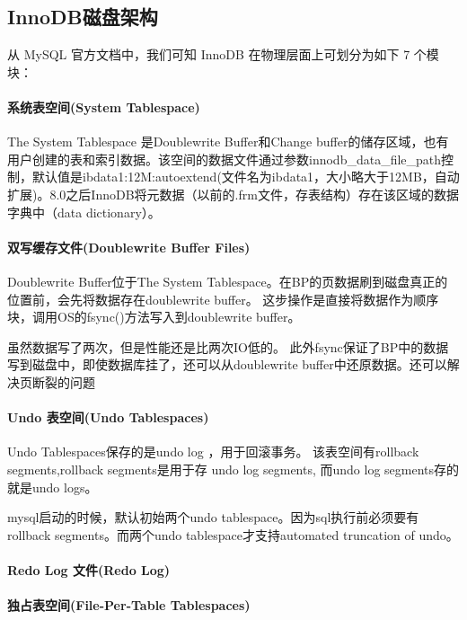 \documentclass[../../../interview-questions.tex]{subfiles}
\begin{document}
\subsection{InnoDB磁盘架构}

从 MySQL 官方文档中，我们可知 InnoDB 在物理层面上可划分为如下 7 个模块：

\paragraph{系统表空间(System Tablespace)}

The System Tablespace 是Doublewrite Buffer和Change buffer的储存区域，也有用户创建的表和索引数据。该空间的数据文件通过参数innodb\_data\_file\_path控制，默认值是ibdata1:12M:autoextend(文件名为ibdata1，大小略大于12MB，自动扩展)。8.0之后InnoDB将元数据（以前的.frm文件，存表结构）存在该区域的数据字典中（data dictionary）。

\paragraph{双写缓存文件(Doublewrite Buffer Files)}

Doublewrite Buffer位于The System Tablespace。在BP的页数据刷到磁盘真正的位置前，会先将数据存在doublewrite buffer。 这步操作是直接将数据作为顺序块，调用OS的fsync()方法写入到doublewrite buffer。

虽然数据写了两次，但是性能还是比两次IO低的。
此外fsync保证了BP中的数据写到磁盘中，即使数据库挂了，还可以从doublewrite buffer中还原数据。还可以解决页断裂的问题

\paragraph{Undo 表空间(Undo Tablespaces)}

Undo Tablespaces保存的是undo log ，用于回滚事务。
该表空间有rollback segments,rollback segments是用于存 undo log segments, 而undo log segments存的就是undo logs。

mysql启动的时候，默认初始两个undo tablespace。因为sql执行前必须要有rollback segments。而两个undo tablespace才支持automated truncation of undo。

\paragraph{Redo Log 文件(Redo Log)}

\paragraph{独占表空间(File-Per-Table Tablespaces)}
\end{document}
